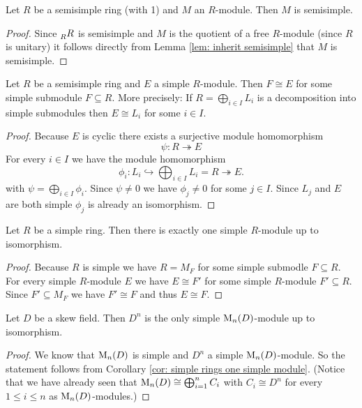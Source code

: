 \begin{prop}
  Let $R$ be a semisimple ring (with 1) and $M$ an $R$-module. Then $M$ is semisimple.
\end{prop}
\begin{proof}
  Since $\prescript{}{R}{R}$ is semisimple and $M$ is the quotient of a free $R$-module (since $R$ is unitary) it follows directly from Lemma \ref{lem: inherit semisimple} that $M$ is semisimple.
\end{proof}


\begin{lem}\label{lem: simple module of semisimple ring is direct summand}
  Let $R$ be a semisimple ring and $E$ a simple $R$-module. Then $F \cong E$ for some simple submodule $F \subseteq R$. More precisely: If $R = \bigoplus_{i \in I} L_i$ is a decomposition into simple submodules then $E \cong L_i$ for some $i \in I$.
\end{lem}
\begin{proof}
  Because $E$ is cyclic there exists a surjective module homomorphism
  \[
    \psi \colon R \twoheadrightarrow E
  \]
  For every $i \in I$ we have the module homomorphism
  \[
    \phi_i \colon L_i \hookrightarrow \bigoplus_{i \in I} L_i = R \twoheadrightarrow E.
  \]
  with $\psi = \bigoplus_{i \in I} \phi_i$. Since $\psi \neq 0$ we have $\phi_j \neq 0$ for some $j \in I$. Since $L_j$ and $E$ are both simple $\phi_j$ is already an isomorphism.
\end{proof}


\begin{cor}\label{cor: simple rings one simple module}
  Let $R$ be a simple ring. Then there is exactly one simple $R$-module up to isomorphism.
\end{cor}
\begin{proof}
  Because $R$ is simple we have $R = M_F$ for some simple submodle $F \subseteq R$. For every simple $R$-module $E$ we have $E \cong F'$ for some simple $R$-module $F' \subseteq R$. Since $F' \subseteq M_F$ we have $F' \cong F$ and thus $E \cong F$.
\end{proof}


\begin{cor}\label{cor: D^n only simple M_n(D)-module}
  Let $D$ be a skew field. Then $D^n$ is the only simple $\operatorname{M}_n(D)$-module up to isomorphism.
\end{cor}
\begin{proof}
  We know that $\operatorname{M}_n(D)$ is simple and $D^n$ a simple $\operatorname{M}_n(D)$-module. So the statement follows from Corollary \ref{cor: simple rings one simple module}. (Notice that we have already seen that $\operatorname{M}_n(D) \cong \bigoplus_{i=1}^n C_i$ with $C_i \cong D^n$ for every $1 \leq i \leq n$ as $\operatorname{M}_n(D)$-modules.)
\end{proof}


